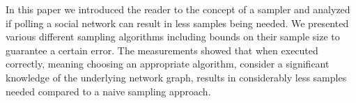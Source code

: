 In this paper we introduced the reader to the concept of a sampler and analyzed if polling a social network can result in less samples being needed.
We presented various different sampling algorithms including bounds on their sample size to guarantee a certain error.
The measurements showed that when executed correctly, meaning choosing an appropriate algorithm, consider a significant knowledge of the underlying network graph, results in considerably less samples needed compared to a naive sampling approach.
